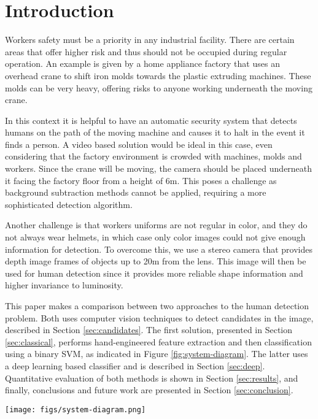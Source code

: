 \section{Introduction}
  Workers safety must be a priority in any industrial facility. There are certain areas that offer higher risk and thus should not be occupied during regular operation. An example is given by a home appliance factory that uses an overhead crane to shift iron molds towards the plastic extruding machines. These molds can be very heavy, offering risks to anyone working underneath the moving crane.

  In this context it is helpful to have an automatic security system that detects humans on the path of the moving machine and causes it to halt in the event it finds a person. A video based solution would be ideal in this case, even considering that the factory environment is crowded with machines, molds and workers. Since the crane will be moving, the camera should be placed underneath it facing the factory floor from a height of 6m. This poses a challenge as background subtraction methods cannot be applied, requiring a more sophisticated detection algorithm.

  Another challenge is that workers uniforms are not regular in color, and they do not always wear helmets, in which case only color images could not give enough information for detection. To overcome this, we use a stereo camera that provides depth image frames of objects up to 20m from the lens. This image will then be used for human detection since it provides more reliable shape information and higher invariance to luminosity.

  This paper makes a comparison between two approaches to the human detection problem. Both uses computer vision techniques to detect candidates in the image, described in Section \ref{sec:candidates}. The first solution, presented in Section \ref{sec:classical}, performs hand-engineered feature extraction and then classification using a binary SVM, as indicated in Figure \ref{fig:system-diagram}. The latter uses a deep learning based classifier and is described in Section \ref{sec:deep}. Quantitative evaluation of both methods is shown in Section \ref{sec:results}, and finally, conclusions and future work are presented in Section \ref{sec:conclusion}.

  \begin{figure*}[!t]
  \centering
  \texttt{[image: figs/system-diagram.png]}
  \caption{System diagram, traditional CV approach}
  \label{fig:system-diagram}
  \end{figure*}


